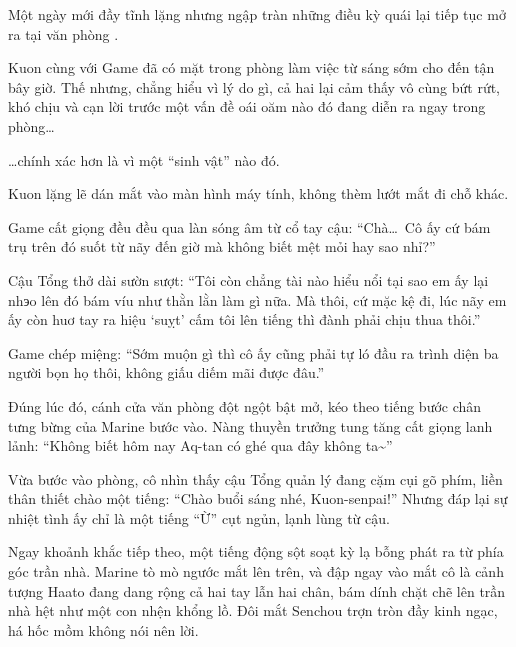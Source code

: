 \documentclass[../main.tex]{subfiles}
\begin{document}

Một ngày mới đầy tĩnh lặng nhưng ngập tràn những điều kỳ quái lại tiếp tục mở ra tại văn phòng \hll.

Kuon cùng với Game đã có mặt trong phòng làm việc từ sáng sớm cho đến tận bây giờ. Thế nhưng, chẳng hiểu vì lý do gì, cả hai lại cảm thấy vô cùng bứt rứt, khó chịu và cạn lời trước một vấn đề oái oăm nào đó đang diễn ra ngay trong phòng\dots

\dots chính xác hơn là vì một ``sinh vật'' nào đó.

Kuon lặng lẽ dán mắt vào màn hình máy tính, không thèm lướt mắt đi chỗ khác.

Game cất giọng đều đều qua làn sóng âm từ cổ tay cậu: ``Chà\dots\ Cô ấy cứ bám trụ trên đó suốt từ nãy đến giờ mà không biết mệt mỏi hay sao nhỉ?''

Cậu Tổng thở dài sườn sượt: ``Tôi còn chẳng tài nào hiểu nổi tại sao em ấy lại nhэo lên đó bám víu như thằn lằn làm gì nữa. Mà thôi, cứ mặc kệ đi, lúc nãy em ấy còn huơ tay ra hiệu `suỵt' cấm tôi lên tiếng thì đành phải chịu thua thôi.''

Game chép miệng: ``Sớm muộn gì thì cô ấy cũng phải tự ló đầu ra trình diện ba người bọn họ thôi, không giấu diếm mãi được đâu.''

Đúng lúc đó, cánh cửa văn phòng đột ngột bật mở, kéo theo tiếng bước chân tưng bừng của Marine bước vào. Nàng thuyền trưởng tung tăng cất giọng lanh lảnh: ``Không biết hôm nay Aq-tan có ghé qua đây không ta\~{}''

Vừa bước vào phòng, cô nhìn thấy cậu Tổng quản lý đang cặm cụi gõ phím, liền thân thiết chào một tiếng: ``Chào buổi sáng nhé, Kuon-senpai!'' Nhưng đáp lại sự nhiệt tình ấy chỉ là một tiếng ``Ừ'' cụt ngủn, lạnh lùng từ cậu.

Ngay khoảnh khắc tiếp theo, một tiếng động sột soạt kỳ lạ bỗng phát ra từ phía góc trần nhà. Marine tò mò ngước mắt lên trên, và đập ngay vào mắt cô là cảnh tượng Haato đang dang rộng cả hai tay lẫn hai chân, bám dính chặt chẽ lên trần nhà hệt như một con nhện khổng lồ. Đôi mắt Senchou trợn tròn đầy kinh ngạc, há hốc mồm không nói nên lời.
\end{document}
